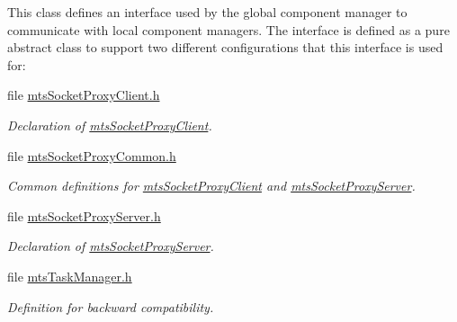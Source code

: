 \begin{DoxyCompactItemize}
\begin{DoxyCompactList}
This class defines an interface used by the global component manager to communicate with local component managers. The interface is defined as a pure abstract class to support two different configurations that this interface is used for\+: \end{DoxyCompactList}\item 
file \hyperlink{mts_socket_proxy_client_8h}{mts\+Socket\+Proxy\+Client.\+h}
\begin{DoxyCompactList}\small\item\em Declaration of \hyperlink{classmts_socket_proxy_client}{mts\+Socket\+Proxy\+Client}. \end{DoxyCompactList}\item 
file \hyperlink{mts_socket_proxy_common_8h}{mts\+Socket\+Proxy\+Common.\+h}
\begin{DoxyCompactList}\small\item\em Common definitions for \hyperlink{classmts_socket_proxy_client}{mts\+Socket\+Proxy\+Client} and \hyperlink{classmts_socket_proxy_server}{mts\+Socket\+Proxy\+Server}. \end{DoxyCompactList}\item 
file \hyperlink{mts_socket_proxy_server_8h}{mts\+Socket\+Proxy\+Server.\+h}
\begin{DoxyCompactList}\small\item\em Declaration of \hyperlink{classmts_socket_proxy_server}{mts\+Socket\+Proxy\+Server}. \end{DoxyCompactList}\item 
file \hyperlink{mts_task_manager_8h}{mts\+Task\+Manager.\+h}
\begin{DoxyCompactList}\small\item\em Definition for backward compatibility. \end{DoxyCompactList}\end{DoxyCompactItemize}
